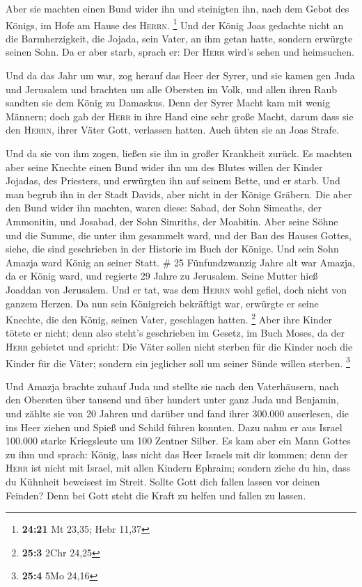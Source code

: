  Aber sie machten einen Bund wider ihn und steinigten
ihn, nach dem Gebot des Königs, im Hofe am Hause des \textsc{Herrn}.
\footnote{\textbf{24:21} Mt 23,35; Hebr 11,37}  Und der
König Joas gedachte nicht an die Barmherzigkeit, die Jojada, sein Vater,
an ihm getan hatte, sondern erwürgte seinen Sohn. Da er aber starb,
sprach er: Der \textsc{Herr} wird's sehen und heimsuchen.

 Und da das Jahr um war, zog herauf das Heer der Syrer,
und sie kamen gen Juda und Jerusalem und brachten um alle Obersten im
Volk, und allen ihren Raub sandten sie dem König zu Damaskus.
 Denn der Syrer Macht kam mit wenig Männern; doch gab der
\textsc{Herr} in ihre Hand eine sehr große Macht, darum dass sie den
\textsc{Herrn}, ihrer Väter Gott, verlassen hatten. Auch übten sie an
Joas Strafe.

 Und da sie von ihm zogen, ließen sie ihn in großer
Krankheit zurück. Es machten aber seine Knechte einen Bund wider ihn um
des Blutes willen der Kinder Jojadas, des Priesters, und erwürgten ihn
auf seinem Bette, und er starb. Und man begrub ihn in der Stadt Davids,
aber nicht in der Könige Gräbern.  Die aber den Bund
wider ihn machten, waren diese: Sabad, der Sohn Simeaths, der Ammonitin,
und Josabad, der Sohn Simriths, der Moabitin.  Aber seine
Söhne und die Summe, die unter ihm gesammelt ward, und der Bau des
Hauses Gottes, siehe, die sind geschrieben in der Historie im Buch der
Könige. Und sein Sohn Amazja ward König an seiner Statt. \# 25
 Fünfundzwanzig Jahre alt war Amazja, da er König ward,
und regierte 29 Jahre zu Jerusalem. Seine Mutter hieß Joaddan von
Jerusalem.  Und er tat, was dem \textsc{Herrn} wohl
gefiel, doch nicht von ganzem Herzen.  Da nun sein
Königreich bekräftigt war, erwürgte er seine Knechte, die den König,
seinen Vater, geschlagen hatten. \footnote{\textbf{25:3} 2Chr 24,25}
 Aber ihre Kinder tötete er nicht; denn also steht's
geschrieben im Gesetz, im Buch Moses, da der \textsc{Herr} gebietet und
spricht: Die Väter sollen nicht sterben für die Kinder noch die Kinder
für die Väter; sondern ein jeglicher soll um seiner Sünde willen
sterben. \footnote{\textbf{25:4} 5Mo 24,16}

 Und Amazja brachte zuhauf Juda und stellte sie nach den
Vaterhäusern, nach den Obersten über tausend und über hundert unter ganz
Juda und Benjamin, und zählte sie von 20 Jahren und darüber und fand
ihrer 300.000 auserlesen, die ins Heer ziehen und Spieß und Schild
führen konnten.  Dazu nahm er aus Israel 100.000 starke
Kriegsleute um 100 Zentner Silber.  Es kam aber ein Mann
Gottes zu ihm und sprach: König, lass nicht das Heer Israels mit dir
kommen; denn der \textsc{Herr} ist nicht mit Israel, mit allen Kindern
Ephraim;  sondern ziehe du hin, dass du Kühnheit beweisest
im Streit. Sollte Gott dich fallen lassen vor deinen Feinden? Denn bei
Gott steht die Kraft zu helfen und fallen zu lassen.

